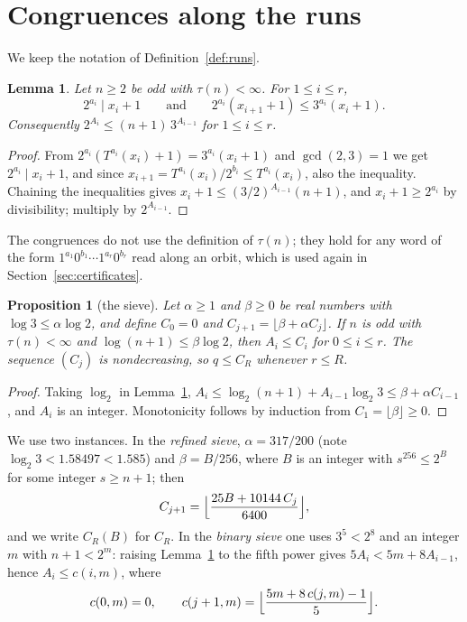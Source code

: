 \documentclass[11pt]{amsart}
\newtheorem{lemma}[theorem]{Lemma}
\newtheorem{proposition}[theorem]{Proposition}
\theoremstyle{definition}
\theoremstyle{remark}
\begin{document}
\section{Congruences along the runs}\label{sec:sieve}

We keep the notation of Definition~\ref{def:runs}.

\begin{lemma}\label{lem:congruence}
Let $n\ge2$ be odd with $\tau(n)<\infty$. For $1\le i\le r$,
\[
2^{a_i}\mid x_i+1\qquad\text{and}\qquad 2^{a_i}(x_{i+1}+1)\le3^{a_i}(x_i+1).
\]
Consequently $2^{A_i}\le(n+1)\,3^{A_{i-1}}$ for $1\le i\le r$.
\end{lemma}

\begin{proof}
From $2^{a_i}(T^{a_i}(x_i)+1)=3^{a_i}(x_i+1)$ and $\gcd(2,3)=1$ we get $2^{a_i}\mid x_i+1$, and since $x_{i+1}=T^{a_i}(x_i)/2^{b_i}\le T^{a_i}(x_i)$, also the inequality. Chaining the inequalities gives $x_i+1\le(3/2)^{A_{i-1}}(n+1)$, and $x_i+1\ge2^{a_i}$ by divisibility; multiply by $2^{A_{i-1}}$.
\end{proof}

The congruences do not use the definition of $\tau(n)$; they hold for any word of the form $1^{a_1}0^{b_1}\cdots1^{a_r}0^{b_r}$ read along an orbit, which is used again in Section~\ref{sec:certificates}.

\begin{proposition}[the sieve]\label{prop:sieve}
Let $\alpha\ge1$ and $\beta\ge0$ be real numbers with $\log3\le\alpha\log2$, and define $C_0=0$ and $C_{j+1}=\lfloor\beta+\alpha C_j\rfloor$. If $n$ is odd with $\tau(n)<\infty$ and $\log(n+1)\le\beta\log2$, then $A_i\le C_i$ for $0\le i\le r$. The sequence $(C_j)$ is nondecreasing, so $q\le C_R$ whenever $r\le R$.
\end{proposition}

\begin{proof}
Taking $\log_2$ in Lemma~\ref{lem:congruence}, $A_{i}\le\log_2(n+1)+A_{i-1}\log_2 3\le\beta+\alpha C_{i-1}$, and $A_i$ is an integer. Monotonicity follows by induction from $C_1=\lfloor\beta\rfloor\ge0$.
\end{proof}

We use two instances. In the \emph{refined sieve}, $\alpha=317/200$ (note $\log_2 3<1.58497<1.585$) and $\beta=B/256$, where $B$ is an integer with $s^{256}\le2^{B}$ for some integer $s\ge n+1$; then
\begin{equation}\label{eq:refined}
C_{j+1}=\Bigl\lfloor\frac{25B+10144\,C_j}{6400}\Bigr\rfloor,
\end{equation}
and we write $C_R(B)$ for $C_R$. In the \emph{binary sieve} one uses $3^{5}<2^{8}$ and an integer $m$ with $n+1<2^{m}$: raising Lemma~\ref{lem:congruence} to the fifth power gives $5A_i<5m+8A_{i-1}$, hence $A_i\le c(i,m)$, where
\begin{equation}\label{eq:binary}
c(0,m)=0,\qquad c(j+1,m)=\Bigl\lfloor\frac{5m+8\,c(j,m)-1}{5}\Bigr\rfloor .
\end{equation}
\end{document}
